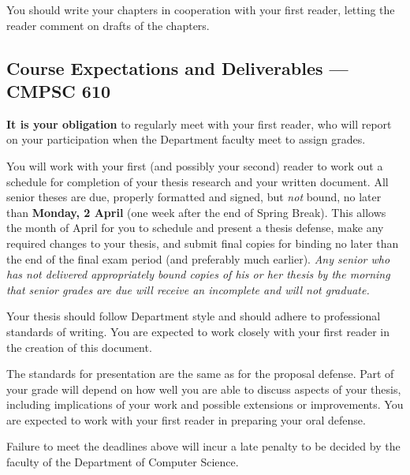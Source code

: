 You should write your chapters in cooperation with your first reader,
letting the reader comment on drafts of the chapters.

\subsection*{Course Expectations and Deliverables --- CMPSC 610}


\medskip
{}
{\bf It is your obligation} to regularly meet with your first reader,
who will report on your participation when the Department faculty
meet to assign grades.

\medskip
{}
You will work with your first (and possibly your second) reader to
work out a schedule for completion of your thesis research and your
written document. All senior theses are due, properly formatted and signed, 
but {\em not} bound, no later than {\bf Monday, 2 April} (one week after the end
of Spring Break). This allows the month of April for you to schedule  and
present a thesis defense, make any required changes to your thesis, and
submit final copies for binding no later than the end of the final
exam period (and preferably much earlier). {\em Any senior who has not 
delivered appropriately bound copies of his or her thesis by the morning
that senior grades are due will receive an incomplete and will not graduate.}

Your thesis should follow Department style and should adhere to
professional standards of writing. You are expected to work closely with
your first reader in the creation of this document.

\medskip 
{}
The standards for presentation are the same as for the proposal defense.
Part of your grade will depend on how well you are able to discuss
aspects of your thesis, including 
implications of your work and possible extensions or improvements.
You are expected to work with your first reader in preparing your
oral defense.

Failure to meet the deadlines above will incur a late penalty to be decided by
the faculty of the Department of Computer Science.

